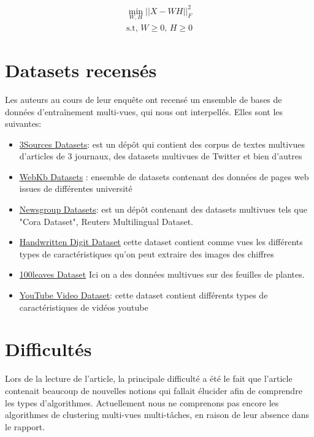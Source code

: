 \documentclass[12pt, french, latin.medieval, a4paper]{report}
\begin{document}
        \begin{equation}
            \begin{aligned}
                \min_{W,H}  {|| X - WH ||}_{F}^{2} \\
                \text{s.t, } W \geq 0 \text{, }H \geq 0
            \end{aligned}
            \label{equa:subspace1}
        \end{equation}

    \section{Datasets recensés}
    Les auteurs au cours de leur enquête ont recensé un ensemble de bases de données d'entraînement multi-vues, qui nous ont interpellés. Elles sont les suivantes:
    \begin{itemize}
        \item \href{http://mlg.ucd.ie/datasets/bbc.html}{3Sources Datasets}: est un dépôt qui contient des corpus de textes multivues d'articles de 3 journaux, des datasets multivues de Twitter et bien d'autres
        \item \href{ttp://www.cs.cmu.edu/afs/cs.cmu.edu/project/theo-20/www/data/}{WebKb Datasets} : ensemble de datasets contenant des données de pages web issues de différentes université
        \item \href{http://lig-membres.imag.fr/grimal/data.html}{Newsgroup Datasets}: est un dépôt contenant des datasets multivues tels que "Cora Dataset", Reuters Multilingual Dataset.

        \item \href{http://archive.ics.uci.edu/ml/datasets/Multiple+Features}{Handwritten Digit Dataset} cette dataset contient comme vues les différents types de caractéristiques qu'on peut extraire des images des chiffres

        \item \href{https://archive.ics.uci.edu/ml/datasets/One-hundred+plant+species+leaves+data+set}{100leaves Dataset} Ici on a des données multivues sur des feuilles de plantes.

        \item \href{https://archive.ics.uci.edu/ml/datasets/YouTube+Multiview+Video+Games+Dataset}{YouTube Video Dataset}: cette dataset contient différents types de caractéristiques de vidéos youtube
    \end{itemize}

    \section{Difficultés}
    Lors de la lecture de l'article, la principale difficulté a été le fait que l'article contenait beaucoup de nouvelles notions qui fallait élucider afin de comprendre les types d'algorithmes. Actuellement nous ne comprenons pas encore les algorithmes de clustering multi-vues multi-tâches, en raison de leur absence dans le rapport.
\end{document}

